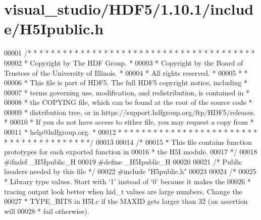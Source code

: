 \hypertarget{visual__studio_2_h_d_f5_21_810_81_2include_2_h5_ipublic_8h_source}{}\section{visual\+\_\+studio/\+H\+D\+F5/1.10.1/include/\+H5\+Ipublic.h}
\label{visual__studio_2_h_d_f5_21_810_81_2include_2_h5_ipublic_8h_source}

\begin{DoxyCode}
00001 \textcolor{comment}{/* * * * * * * * * * * * * * * * * * * * * * * * * * * * * * * * * * * * * * *}
00002 \textcolor{comment}{ * Copyright by The HDF Group.                                               *}
00003 \textcolor{comment}{ * Copyright by the Board of Trustees of the University of Illinois.         *}
00004 \textcolor{comment}{ * All rights reserved.                                                      *}
00005 \textcolor{comment}{ *                                                                           *}
00006 \textcolor{comment}{ * This file is part of HDF5.  The full HDF5 copyright notice, including     *}
00007 \textcolor{comment}{ * terms governing use, modification, and redistribution, is contained in    *}
00008 \textcolor{comment}{ * the COPYING file, which can be found at the root of the source code       *}
00009 \textcolor{comment}{ * distribution tree, or in https://support.hdfgroup.org/ftp/HDF5/releases.  *}
00010 \textcolor{comment}{ * If you do not have access to either file, you may request a copy from     *}
00011 \textcolor{comment}{ * help@hdfgroup.org.                                                        *}
00012 \textcolor{comment}{ * * * * * * * * * * * * * * * * * * * * * * * * * * * * * * * * * * * * * * */}
00013 
00014 \textcolor{comment}{/*}
00015 \textcolor{comment}{ * This file contains function prototypes for each exported function in}
00016 \textcolor{comment}{ * the H5I module.}
00017 \textcolor{comment}{ */}
00018 \textcolor{preprocessor}{#ifndef \_H5Ipublic\_H}
00019 \textcolor{preprocessor}{#define \_H5Ipublic\_H}
00020 
00021 \textcolor{comment}{/* Public headers needed by this file */}
00022 \textcolor{preprocessor}{#include "H5public.h"}
00023 
00024 \textcolor{comment}{/*}
00025 \textcolor{comment}{ * Library type values.  Start with `1' instead of `0' because it makes the}
00026 \textcolor{comment}{ * tracing output look better when hid\_t values are large numbers.  Change the}
00027 \textcolor{comment}{ * TYPE\_BITS in H5I.c if the MAXID gets larger than 32 (an assertion will}
00028 \textcolor{comment}{ * fail otherwise).}

\end{DoxyCode}
